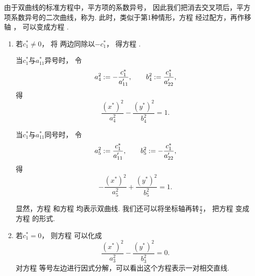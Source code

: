 \begin{enumerate}
	由于双曲线的标准方程中，平方项的系数异号，
	因此我们把消去交叉项后，平方项系数异号的二次曲线，称为.
	此时，类似于第1种情形，方程 
	经过配方，再作移轴 ，
	可以变成方程 .
	\begin{enumerate}
		\item 若\(c^*_1 \neq 0\)，
		将 
		两边同除以\(-c^*_1\)，
		得方程 .

		当\(c^*_1\)与\(a^*_{11}\)异号时，
		令\begin{equation*}
			a_4^2 := -\frac{c^*_1}{a'_{11}},
			\qquad
			b_4^2 := \frac{c^*_1}{a'_{22}},
		\end{equation*}
		得\begin{equation}\label{equation:二次曲线方程的化简及其类型.双曲线的标准方程1}
			\frac{(x^*)^2}{a_4^2} - \frac{(y^*)^2}{b_4^2} = 1.
		\end{equation}

		当\(c^*_1\)与\(a^*_{11}\)同号时，
		令\begin{equation*}
			a_5^2 := \frac{c^*_1}{a'_{11}},
			\qquad
			b_5^2 := -\frac{c^*_1}{a'_{22}},
		\end{equation*}
		得\begin{equation}\label{equation:二次曲线方程的化简及其类型.双曲线的标准方程2}
			- \frac{(x^*)^2}{a_5^2} + \frac{(y^*)^2}{b_5^2} = 1.
		\end{equation}

		显然，方程 
		和方程  均表示双曲线.
		我们还可以将坐标轴再转\(\frac\pi2\)，
		把方程 
		变成方程  的形式.

		\item 若\(c^*_1 = 0\)，
		则方程 
		可以化成\begin{equation}\label{equation:二次曲线方程的化简及其类型.相交直线的方程}
			\frac{(x^*)^2}{a_3^2} - \frac{(y^*)^2}{b_3^2} = 0.
		\end{equation}
		对方程 
		等号左边进行因式分解，可以看出这个方程表示一对相交直线.
	\end{enumerate}


\end{enumerate}
